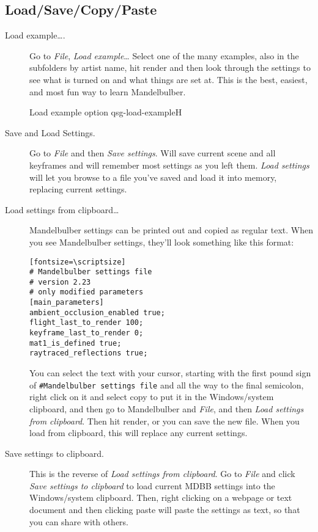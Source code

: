 \subsection{Load/Save/Copy/Paste}\label{qsg-load-save}

\begin{description}
	\item[Load example….] Go to \emph{File}, \emph{Load example}… Select one of the many examples, also in the subfolders by artist name, hit render and then look through the settings to see what is turned on and what things are set at. This is the best, easiest, and most fun way to learn Mandelbulber. 

	{Load example option}
	{qsg-load-example}{H}

	\item[Save and Load Settings.] Go to \emph{File} and then \emph{Save settings}. Will save current scene and all keyframes and will remember most settings as you left them. \emph{Load settings} will let you browse to a file you’ve saved and load it into memory, replacing current settings. 

	\item[Load settings from clipboard…] Mandelbulber settings can be printed out and copied as regular text. When you see Mandelbulber settings, they’ll look something like this format:
	
	\begin{verbatim}[fontsize=\scriptsize]
# Mandelbulber settings file
# version 2.23
# only modified parameters
[main_parameters]
ambient_occlusion_enabled true;
flight_last_to_render 100;
keyframe_last_to_render 0;
mat1_is_defined true;
raytraced_reflections true; 
	\end{verbatim}

	You can select the text with your cursor, starting with the first pound sign of \texttt{\#Mandelbulber settings file} and all the way to the final semicolon, right click on it and select copy to put it in the Windows/system clipboard, and then go to Mandelbulber and \emph{File}, and then \emph{Load settings from clipboard}. Then hit render, or you can save the new file. When you load from clipboard, this will replace any current settings. 

    \item[Save settings to clipboard.] This is the reverse of \emph{Load settings from clipboard}. Go to \emph{File} and click \emph{Save settings to clipboard} to load current MDBB settings into the Windows/system clipboard. Then, right clicking on a webpage or text document and then clicking paste will paste the settings as text, so that you can share with others. 
        
\end{description}

